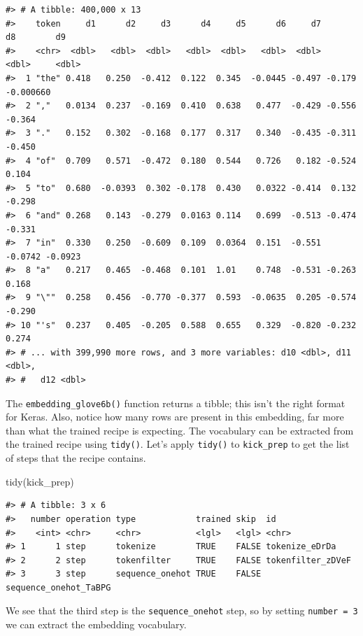 \documentclass[
]{krantz}
\makeatletter
\newenvironment{Shaded}{\begin{snugshade}}{\end{snugshade}}
\newcommand{\FunctionTok}[1]{\textcolor[rgb]{0.00,0.00,0.00}{#1}}
\newcommand{\NormalTok}[1]{#1}
\newenvironment{kframe}{%
\medskip{}
\setlength{\fboxsep}{.8em}
 \def\at@end@of@kframe{}%
 \ifinner\ifhmode%
  \def\at@end@of@kframe{\end{minipage}}%
  \begin{minipage}{\columnwidth}%
 \fi\fi%
 \def\FrameCommand##1{\hskip\@totalleftmargin \hskip-\fboxsep
 \colorbox{shadecolor}{##1}\hskip-\fboxsep
     \hskip-\linewidth \hskip-\@totalleftmargin \hskip\columnwidth}%
 \MakeFramed {\advance\hsize-\width
   \@totalleftmargin\z@ \linewidth\hsize
   \@setminipage}}%
 {\par\unskip\endMakeFramed%
 \at@end@of@kframe}
\renewenvironment{Shaded}{\begin{kframe}}{\end{kframe}}
\makeatother
\begin{document}
\begin{verbatim}
#> # A tibble: 400,000 x 13
#>    token     d1      d2     d3      d4     d5      d6     d7      d8        d9
#>    <chr>  <dbl>   <dbl>  <dbl>   <dbl>  <dbl>   <dbl>  <dbl>   <dbl>     <dbl>
#>  1 "the" 0.418   0.250  -0.412  0.122  0.345  -0.0445 -0.497 -0.179  -0.000660
#>  2 ","   0.0134  0.237  -0.169  0.410  0.638   0.477  -0.429 -0.556  -0.364   
#>  3 "."   0.152   0.302  -0.168  0.177  0.317   0.340  -0.435 -0.311  -0.450   
#>  4 "of"  0.709   0.571  -0.472  0.180  0.544   0.726   0.182 -0.524   0.104   
#>  5 "to"  0.680  -0.0393  0.302 -0.178  0.430   0.0322 -0.414  0.132  -0.298   
#>  6 "and" 0.268   0.143  -0.279  0.0163 0.114   0.699  -0.513 -0.474  -0.331   
#>  7 "in"  0.330   0.250  -0.609  0.109  0.0364  0.151  -0.551 -0.0742 -0.0923  
#>  8 "a"   0.217   0.465  -0.468  0.101  1.01    0.748  -0.531 -0.263   0.168   
#>  9 "\""  0.258   0.456  -0.770 -0.377  0.593  -0.0635  0.205 -0.574  -0.290   
#> 10 "'s"  0.237   0.405  -0.205  0.588  0.655   0.329  -0.820 -0.232   0.274   
#> # ... with 399,990 more rows, and 3 more variables: d10 <dbl>, d11 <dbl>,
#> #   d12 <dbl>
\end{verbatim}

The \texttt{embedding\_glove6b()} function returns a tibble; this isn't the right format for Keras. Also, notice how many rows are present in this embedding, far more than what the trained recipe is expecting. The vocabulary can be extracted from the trained recipe using \texttt{tidy()}. Let's apply \texttt{tidy()} to \texttt{kick\_prep} to get the list of steps that the recipe contains.

\begin{Shaded}
\begin{Highlighting}[]
\FunctionTok{tidy}\NormalTok{(kick\_prep)}
\end{Highlighting}
\end{Shaded}

\begin{verbatim}
#> # A tibble: 3 x 6
#>   number operation type            trained skip  id                   
#>    <int> <chr>     <chr>           <lgl>   <lgl> <chr>                
#> 1      1 step      tokenize        TRUE    FALSE tokenize_eDrDa       
#> 2      2 step      tokenfilter     TRUE    FALSE tokenfilter_zDVeF    
#> 3      3 step      sequence_onehot TRUE    FALSE sequence_onehot_TaBPG
\end{verbatim}

We see that the third step is the \texttt{sequence\_onehot} step, so by setting \texttt{number\ =\ 3} we can extract the embedding vocabulary.
\end{document}
